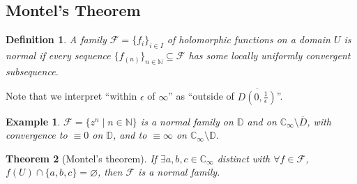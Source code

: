 \documentclass{article}
\theoremstyle{plain}\theoremheaderfont{\normalfont\itshape}\theorembodyfont{\rmfamily}\theoremseparator{.}\newtheorem*{rem}{Remark}\newtheorem*{ex}{Example}\newtheorem*{proof}{Proof}\newtheorem*{altp}{Alternative proof}\newtheorem*{con}{Consequences}\newtheorem*{notn}{Notations}\newtheorem*{cau}{Caution}\newtheorem*{term}{Terminology}\newtheorem*{keyex}{Key example}
\theoremstyle{plain}\theoremheaderfont{\normalfont\bfseries}\theorembodyfont{\rmfamily}\theoremseparator{.}\newtheorem{thm}{Theorem}[section]\newtheorem{lem}[thm]{Lemma}\newtheorem{prop}[thm]{Proposition}\newtheorem*{cor}{Corollary}\newtheorem{defn}[thm]{Definition}\newtheorem{clm}[thm]{Claim}\newtheorem{clminproof}{Claim}\newtheorem{leminproof}{Lemma}\newtheorem{app}{Application}
\theoremstyle{break}\theoremheaderfont{\normalfont\itshape}\theorembodyfont{\rmfamily}\theoremseparator{.\medskip}\newtheorem*{proofskip}{Proof}\newtheorem*{exs}{Examples}\newtheorem*{rems}{Remarks}\newtheorem*{rec}{Recall}\newtheorem*{ppts}{Properties}
\theoremstyle{break}\theoremheaderfont{\normalfont\bfseries}\theorembodyfont{\rmfamily}\theoremseparator{.\medskip}\newtheorem{lemskip}[thm]{Lemma}\newtheorem{defnskip}[thm]{Definition}\newtheorem{propskip}[thm]{Proposition}\newtheorem{thmskip}[thm]{Theorem}
\numberwithin{equation}{section}
\newcommand{\NN}{\mathbb{N}}
\newcommand{\CC}{\mathbb{C}}
\newcommand{\DD}{\mathbb{D}}
\begin{document}
    \subsection{Montel's Theorem}
    \begin{defn}
        A family \(\mathcal{F}=\{f_i\}_{i\in I}\) of holomorphic functions on a domain \(U\) is \textit{normal} if every sequence \(\{f_(n)\}_{n\in\NN}\subseteq\mathcal{F}\) has some locally uniformly convergent subsequence.
    \end{defn}
    Note that we interpret ``within \(\epsilon\) of \(\infty\)'' as ``outside of \(\overline{D(0,\frac{1}{\epsilon})}\)''.
    \begin{ex}
        \(\mathcal{F}=\{z^n\mid n\in\NN\}\) is a normal family on \(\DD\) and on \(\CC_\infty\setminus\overline{D}\), with convergence to \(\equiv 0\) on \(\DD\), and to \(\equiv\infty\) on \(\CC_\infty\setminus\DD\).
    \end{ex}
    \begin{thm}[Montel's theorem]
        If \(\exists a,b,c\in\CC_\infty\) distinct with \(\forall f\in\mathcal{F}\), \(f(U)\cap\{a,b,c\}=\varnothing\), then \(\mathcal{F}\) is a normal family.
    \end{thm}
\end{document}
